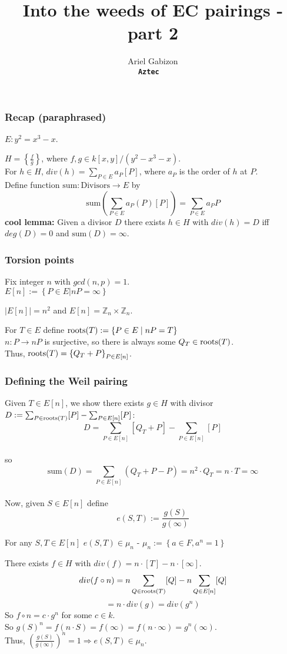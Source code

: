 \documentclass[shadesubsections,compress,14pt,mathserif]{beamer}
\title{\large{Into the weeds of EC pairings - part 2}}    %
\author{\small{Ariel Gabizon}\\                 %
\tt{\footnotesize{\textbf{Aztec} }}  }
\newcommand{\set}[1]{\ensuremath{\left\{#1\right\}}}
\newcommand{\defeq}{\ensuremath{:=}}
\newcommand{\nl}{\\ \pause \vspace{0.2in}}
\newcommand{\roots}{\ensuremath\textrm{roots}}
\begin{document}
\boldmath
\begin{frame}
  \titlepage
\end{frame}



\begin{frame}
\frametitle{Recap (paraphrased)}   %
$E: y^2=x^3-x$.  

$H=\set{\frac{f}{g}}$, where $f,g\in k[x,y]/(y^2-x^3-x)$. \\ \pause
\vspace{0.2in}
For $h\in H$,
$div(h)=\sum_{P\in E} a_P[P]$,
where $a_P$ is the order of $h$ at $P$.\\ \pause
Define function $\mathrm{sum}:\mathrm{Divisors}\to E$ by
$$\mathrm{sum}\left(\sum_{P\in E} a_P(P)[P]\right) = \sum_{P\in E} a_P P$$\pause
\textbf{cool lemma:} Given a divisor $D$ there exists $h\in H$ with $div(h)=D$ iff
$deg(D)=0$ and $\mathrm{sum}(D)=\infty$.

\end{frame}
\begin{frame}
\frametitle{Torsion points}
Fix integer $n$ with $gcd(n,p)=1$.\\
$E[n]\defeq \set{P\in E|n P = \infty}$ \nl
\begin{theorem}
 $|E[n]|=n^2$ and $E[n]=\mathbb{Z}_n\times \mathbb{Z}_n$.\nl
 \end{theorem}
For $T\in E$ define $\roots(T)\defeq \set{P\in E\;| \;n P = T}$ \nl
$n:P\to n P$ is surjective, so  there is always some $Q_T\in \roots(T)$. \nl
Thus, $\roots(T)=\set{Q_T+P}_{P\in E[n]}$.

\end{frame}
\begin{frame}
\frametitle{Defining the Weil pairing}
\pause
Given $T\in E[n]$, we show there exists $g\in H$ with divisor
$D\defeq \sum_{P\in \roots(T)} [P] - \sum_{P\in E[n]} [P]$:\nl
$$D= \sum_{P\in E[n]} [Q_T+P] - \sum_{P\in E[n]} [P]$$\\ \pause
so $$\mathrm{sum}(D) =\sum_{P\in E[n]}(Q_T+P-P) = n^2\cdot Q_T = n\cdot T = \infty$$\\ \pause 
Now, given $S\in E[n]$ define
$$e(S,T)\defeq \frac{g(S)}{g(\infty)}$$


\end{frame}
\begin{frame}
 \begin{lemma} For any $S,T\in E[n]$ $e(S,T)\in \mu_n$ -  $\scriptstyle{\mu_n \defeq \set{a\in F, a^n=1}}$
 \end{lemma}
 There exists $f\in H$ with $div(f) = n\cdot [T] - n\cdot[\infty]$.\\ \pause
 $$div(f\circ n) = n\sum_{Q\in \roots(T)} [Q] - n \sum_{Q\in E[n]} [Q]$$
 $$= n\cdot div(g)= div(g^n)$$\pause
 So $f\circ n = c\cdot g^n$ for some $c\in k$.\nl
 So
    $g(S)^n = f(n\cdot S) = f(\infty) = f(n\cdot \infty) = g^n(\infty)$.\\ \pause
    Thus, $\left(\frac{g(S)}{g(\infty)}\right)^n =1 \Rightarrow e(S,T)\in \mu_n$.
 \end{frame}
\end{document}
